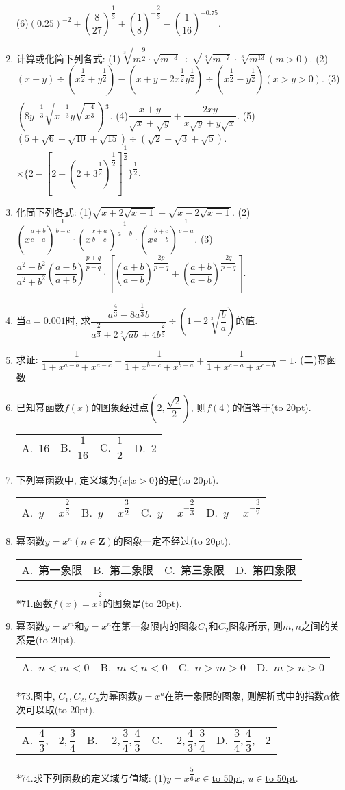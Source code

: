 \documentclass[10pt,a4paper]{article}
\newcommand{\blank}[1]{\underline{\hbox to #1pt{}}}
\newcommand{\bracket}[1]{(\hbox to #1pt{})}
\newcommand{\fourch}[4]{\par\begin{tabular}{p{.23\textwidth}p{.23\textwidth}p{.23\textwidth}p{.23\textwidth}}
A.~#1 &B.~#2& C.~#3& D.~#4
\end{tabular}}
\begin{document}
\begin{enumerate}[1.]
(6)$(0.25)^{-2}+(\dfrac 8{27})^{\dfrac 13}+(\dfrac 18)^{-\dfrac 23}-(\dfrac 1{16})^{-0.75}$.
\item 计算或化简下列各式:
(1)$\sqrt [3]{m^{\dfrac 92}\cdot \sqrt {m^{-3}}}\div \sqrt {\sqrt [3]{m^{-7}}}\cdot \sqrt [3]{m^{13}}(m>0)$.
(2)$(x-y)\div (x^{\dfrac 12}+y^{\dfrac 12})-(x+y-2x^{\dfrac 12}y^{\dfrac 12})\div (x^{\dfrac 12}-y^{\dfrac 12})(x>y>0)$.
(3)$(8y^{-\dfrac 13}\sqrt {x^{-\dfrac 13}y\sqrt {x^{\dfrac 43}}})^{\dfrac 13}$.
(4)$\dfrac{x+y}{\sqrt x+\sqrt y}+\dfrac{2xy}{x\sqrt y+y\sqrt x}$.
(5)$(5+\sqrt 6+\sqrt {10}+\sqrt {15})\div (\sqrt 2+\sqrt 3+\sqrt 5)$.
$\times {\{2-[ 2+(2+3^{\dfrac 12})^{\dfrac 12} ]^{\dfrac 12}\}^{\dfrac 12}}$.
\item 化简下列各式:
(1)$\sqrt {x+2\sqrt {x-1}}+\sqrt {x-2\sqrt {x-1}}$.
(2)$(x^{\dfrac{a+b}{c-a}})^{\dfrac 1{b-c}}\cdot (x^{\dfrac{x+a}{b-c}})^{\dfrac 1{a-b}}\cdot (x^{\dfrac{b+c}{a-b}})^{\dfrac 1{c-a}}$.
(3)$\dfrac{a^2-b^2}{a^2+b^2}(\dfrac{a-b}{a+b})^{\dfrac{p+q}{p-q}}\cdot [ (\dfrac{a+b}{a-b})^{\dfrac{2p}{p-q}}+(\dfrac{a+b}{a-b})^{\dfrac{2q}{p-q}} ]$.
\item 当$a=0.001$时, 求$\dfrac{a^{\dfrac 43}-8a^{\dfrac 13}b}{a^{\dfrac 23}+2\sqrt [3]{ab}+4b^{\dfrac 23}}\div (1-2\sqrt [3]{\dfrac ba})$的值.
\item 求证: $\dfrac 1{1+x^{a-b}+x^{a-c}}+\dfrac 1{1+x^{b-c}+x^{b-a}}+\dfrac 1{1+x^{c-a}+x^{c-b}}=1$.
(二)幂函数
\item 已知幂函数$f(x)$的图象经过点$(2,\dfrac{\sqrt 2}2)$, 则$f(4)$的值等于\bracket{20}.
\fourch{16}{$\dfrac 1{16}$}{$\dfrac 12$}{2}
\item 下列幂函数中, 定义域为$\{x|x>0\}$的是\bracket{20}.
\fourch{$y=x^{\dfrac 23}$}{$y=x^{\dfrac 32}$}{$y=x^{-\dfrac 23}$}{$y=x^{-\dfrac 32}$}
\item 幂函数$y=x^n(n\in \mathbf{Z})$的图象一定不经过\bracket{20}.
\fourch{第一象限}{第二象限}{第三象限}{第四象限}
*71.函数$f(x)=x^{\dfrac 23}$的图象是\bracket{20}.
\item 幂函数$y=x^m$和$y=x^n$在第一象限内的图象$C_1$和$C_2$图象所示, 则$m,n$之间的关系是\bracket{20}.
\fourch{$n<m<0$}{$m<n<0$}{$n>m>0$}{$m>n>0$}
*73.图中, $C_1,C_2,C_3$为幂函数$y=x^a$在第一象限的图象, 则解析式中的指数$\alpha$依次可以取\bracket{20}.
\fourch{$\dfrac 43,-2,\dfrac 34$}{$-2,\dfrac 34,\dfrac 43$}{$-2,\dfrac 43,\dfrac 34$}{$\dfrac 34,\dfrac 43,-2$}
*74.求下列函数的定义域与值域:
(1)$y=x^{\dfrac 56}x\in$\blank{50}, $u\in$\blank{50}.

\end{enumerate}
\end{document}
